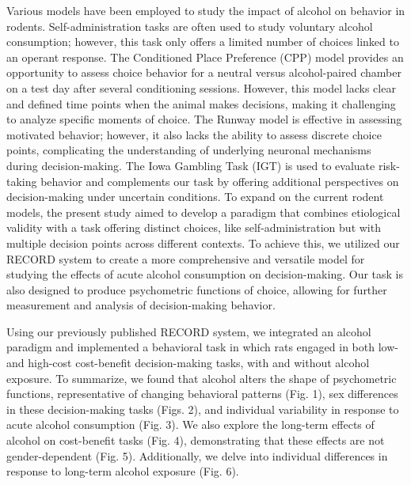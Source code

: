 \documentclass{article}
\begin{document}
Various models have been employed to study the impact of alcohol on behavior in rodents. Self-administration tasks are often used to study voluntary alcohol consumption; however, this task only offers a limited number of choices linked to an operant response\cite{beckwith2016alcohol}. The Conditioned Place Preference (CPP) model provides an opportunity to assess choice behavior for a neutral versus alcohol-paired chamber on a test day after several conditioning sessions. However, this model lacks clear and defined time points when the animal makes decisions, making it challenging to analyze specific moments of choice\cite{lucke2011varied}. The Runway model is effective in assessing motivated behavior; however, it also lacks the ability to assess discrete choice points, complicating the understanding of underlying neuronal mechanisms during decision-making\cite{pandy2016design}. The Iowa Gambling Task (IGT) is used to evaluate risk-taking behavior and complements our task by offering additional perspectives on decision-making under uncertain conditions\cite{spoelder2015altered}. To expand on the current rodent models, the present study aimed to develop a paradigm that combines etiological validity with a task offering distinct choices, like self-administration but with multiple decision points across different contexts. To achieve this, we utilized our RECORD system to create a more comprehensive and versatile model for studying the effects of acute alcohol consumption on decision-making\cite{ibanez2024record}. Our task is also designed to produce psychometric functions of choice, allowing for further measurement and analysis of decision-making behavior.

\vspace{1em}

Using our previously published RECORD system\cite{ibanez2024record}, we integrated an alcohol paradigm and implemented a behavioral task in which rats engaged in both low- and high-cost cost-benefit decision-making tasks, with and without alcohol exposure. To summarize, we found that alcohol alters the shape of psychometric functions, representative of changing behavioral patterns (Fig. 1), sex differences in these decision-making tasks (Figs. 2), and individual variability in response to acute alcohol consumption (Fig. 3). We also explore the long-term effects of alcohol on cost-benefit tasks (Fig. 4), demonstrating that these effects are not gender-dependent (Fig. 5). Additionally, we delve into individual differences in response to long-term alcohol exposure (Fig. 6).
\end{document}
